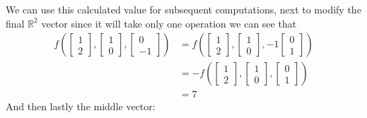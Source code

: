 \documentclass{report}
\begin{document}
We can use this calculated value for subsequent computations, next to modify the final $\mathbb{R}^2$ vector since it will take only one operation we can see that
$$
\begin{aligned}
f\left(\begin{bmatrix} 1 \\ 2 \end{bmatrix}, \begin{bmatrix} 1 \\ 0 \end{bmatrix}, \begin{bmatrix} 0 \\ -1 \end{bmatrix} \right) & = 
f\left(\begin{bmatrix} 1 \\ 2 \end{bmatrix}, \begin{bmatrix} 1 \\ 0 \end{bmatrix}, -1\begin{bmatrix} 0 \\ 1 \end{bmatrix} \right) \\
& = -f\left(\begin{bmatrix} 1 \\ 2 \end{bmatrix}, \begin{bmatrix} 1 \\ 0 \end{bmatrix}, \begin{bmatrix} 0 \\ 1 \end{bmatrix} \right) \\
& = 7
\end{aligned}
$$
And then lastly the middle vector:
\end{document}
